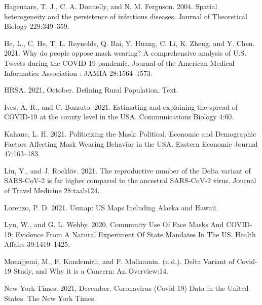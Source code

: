 \documentclass[
  12pt,
]{article}
\newlength{\cslhangindent}
\newlength{\cslentryspacingunit} %
\newenvironment{CSLReferences}[2] %
 {%
  \setlength{\parindent}{0pt}
  \ifodd #1
  \let\oldpar\par
  \def\par{\hangindent=\cslhangindent\oldpar}
  \fi
  \setlength{\parskip}{#2\cslentryspacingunit}
 }%
 {}
\begin{document}
\begin{CSLReferences}{1}{0}
\leavevmode{}%
Hagenaars, T. J., C. A. Donnelly, and N. M. Ferguson. 2004. Spatial heterogeneity and the persistence of infectious diseases. Journal of Theoretical Biology 229:349--359.

\leavevmode{}%
He, L., C. He, T. L. Reynolds, Q. Bai, Y. Huang, C. Li, K. Zheng, and Y. Chen. 2021. Why do people oppose mask wearing? {A} comprehensive analysis of {U}.{S}. Tweets during the {COVID}-19 pandemic. Journal of the American Medical Informatics Association : JAMIA 28:1564--1573.

\leavevmode{}%
HRSA. 2021, October. Defining {Rural} {Population}. Text.

\leavevmode{}%
Ives, A. R., and C. Bozzuto. 2021. Estimating and explaining the spread of {COVID}-19 at the county level in the {USA}. Communications Biology 4:60.

\leavevmode{}%
Kahane, L. H. 2021. Politicizing the {Mask}: {Political}, {Economic} and {Demographic} {Factors} {Affecting} {Mask} {Wearing} {Behavior} in the {USA}. Eastern Economic Journal 47:163--183.

\leavevmode{}%
Liu, Y., and J. Rocklöv. 2021. The reproductive number of the {Delta} variant of {SARS}-{CoV}-2 is far higher compared to the ancestral {SARS}-{CoV}-2 virus. Journal of Travel Medicine 28:taab124.

\leavevmode{}%
Lorenzo, P. D. 2021. Usmap: {US} {Maps} {Including} {Alaska} and {Hawaii}.

\leavevmode{}%
Lyu, W., and G. L. Wehby. 2020. Community {Use} {Of} {Face} {Masks} {And} {COVID}-19: {Evidence} {From} {A} {Natural} {Experiment} {Of} {State} {Mandates} {In} {The} {US}. Health Affairs 39:1419--1425.

\leavevmode{}%
Monajjemi, M., F. Kandemirli, and F. Mollaamin. (n.d.). Delta {Variant} of {Covid}-19 {Study}, and {Why} it is a {Concern}: {An} {Overview}:14.

\leavevmode{}%
New York Times. 2021, December. Coronavirus ({Covid}-19) {Data} in the {United} {States}. The New York Times.


\end{CSLReferences}
\end{document}
